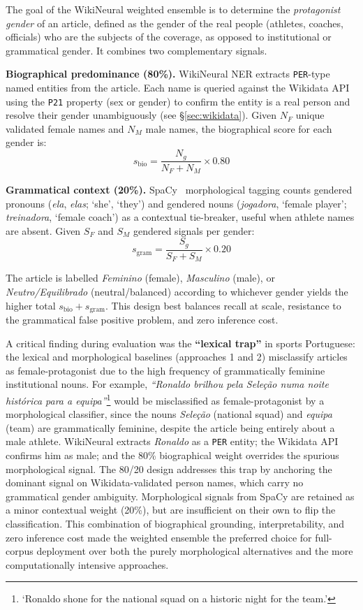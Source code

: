 \documentclass[11pt,a4paper]{article}
\begin{document}
The goal of the WikiNeural weighted ensemble is to determine the \textit{protagonist gender} of an article, defined as the gender of the real people (athletes, coaches, officials) who are the subjects of the coverage, as opposed to institutional or grammatical gender. It combines two complementary signals.

\textbf{Biographical predominance (80\%).} WikiNeural NER extracts \texttt{PER}-type named entities from the article. Each name is queried against the Wikidata API using the \texttt{P21} property (sex or gender) to confirm the entity is a real person and resolve their gender unambiguously (see §\ref{sec:wikidata}). Given $N_F$ unique validated female names and $N_M$ male names, the biographical score for each gender is:
\begin{equation}
  s_{\text{bio}} = \frac{N_g}{N_F + N_M} \times 0.80
\end{equation}

\textbf{Grammatical context (20\%).} SpaCy~\cite{SpaCy} morphological tagging counts gendered pronouns (\textit{ela}, \textit{elas}; `she', `they') and gendered nouns (\textit{jogadora}, `female player'; \textit{treinadora}, `female coach') as a contextual tie-breaker, useful when athlete names are absent. Given $S_F$ and $S_M$ gendered signals per gender:
\begin{equation}
  s_{\text{gram}} = \frac{S_g}{S_F + S_M} \times 0.20
\end{equation}

The article is labelled \textit{Feminino} (female), \textit{Masculino} (male), or \textit{Neutro/Equilibrado} (neutral/balanced) according to whichever gender yields the higher total $s_{\text{bio}} + s_{\text{gram}}$. This design best balances recall at scale, resistance to the grammatical false positive problem, and zero inference cost.

A critical finding during evaluation was the \textbf{``lexical trap''} in sports Portuguese: the lexical and morphological baselines (approaches 1 and 2) misclassify articles as female-protagonist due to the high frequency of grammatically feminine institutional nouns. For example, \textit{``Ronaldo brilhou pela Seleção numa noite histórica para a equipa''}\footnote{`Ronaldo shone for the national squad on a historic night for the team.'} would be misclassified as female-protagonist by a morphological classifier, since the nouns \textit{Seleção} (national squad) and \textit{equipa} (team) are grammatically feminine, despite the article being entirely about a male athlete. WikiNeural extracts \textit{Ronaldo} as a \texttt{PER} entity; the Wikidata API confirms him as male; and the 80\% biographical weight overrides the spurious morphological signal. The 80/20 design addresses this trap by anchoring the dominant signal on Wikidata-validated person names, which carry no grammatical gender ambiguity. Morphological signals from SpaCy are retained as a minor contextual weight (20\%), but are insufficient on their own to flip the classification. This combination of biographical grounding, interpretability, and zero inference cost made the weighted ensemble the preferred choice for full-corpus deployment over both the purely morphological alternatives and the more computationally intensive approaches.
\end{document}
